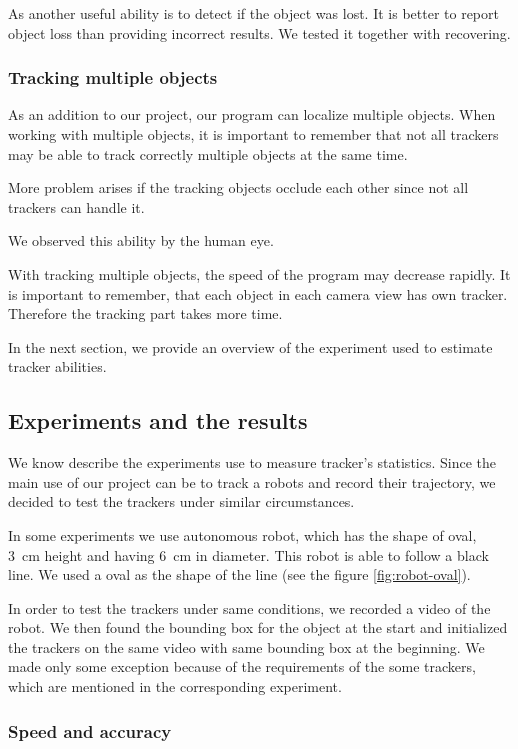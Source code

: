 As another useful ability is to detect if the object was lost. It is better to
report object loss than providing incorrect results. We tested it together with
recovering.

\subsubsection*{Tracking multiple objects}

As an addition to our project, our program can localize multiple objects. When
working with multiple objects, it is important to remember that not all
trackers may be able to track correctly multiple objects at the same time.

More problem arises if the tracking objects occlude each other since not all
trackers can handle it.

We observed this ability by the human eye.

With tracking multiple objects, the speed of the program may decrease rapidly.
It is important to remember, that each object in each camera view has own
tracker. Therefore the tracking part takes more time.

In the next section, we provide an overview of the experiment used to estimate
tracker abilities.


\subsection{Experiments and the results}

We know describe the experiments use to measure tracker's statistics. Since the
main use of our project can be to track a robots and record their trajectory,
we decided to test the trackers under similar circumstances.

In some experiments we use autonomous robot, which has the shape of oval, 3~cm
height and having 6~cm in diameter. This robot is able to follow a black line.
We used a oval as the shape of the line (see the figure \ref{fig:robot-oval}).

In order to test the trackers under same conditions, we recorded a video of the
robot. We then found the bounding box for the object at the start and
initialized the trackers on the same video with same bounding box at the
beginning. We made only some exception because of the requirements of the some
trackers, which are mentioned in the corresponding experiment.

\subsubsection{Speed and accuracy}

